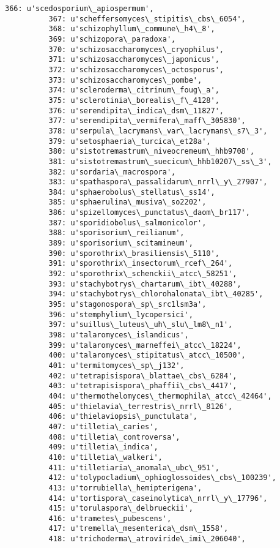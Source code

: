 \documentclass[11pt]{article}
\begin{document}
\begin{Verbatim}[commandchars=\\\{\}]
          366: u'scedosporium\_apiospermum',
          367: u'scheffersomyces\_stipitis\_cbs\_6054',
          368: u'schizophyllum\_commune\_h4\_8',
          369: u'schizopora\_paradoxa',
          370: u'schizosaccharomyces\_cryophilus',
          371: u'schizosaccharomyces\_japonicus',
          372: u'schizosaccharomyces\_octosporus',
          373: u'schizosaccharomyces\_pombe',
          374: u'scleroderma\_citrinum\_foug\_a',
          375: u'sclerotinia\_borealis\_f\_4128',
          376: u'serendipita\_indica\_dsm\_11827',
          377: u'serendipita\_vermifera\_maff\_305830',
          378: u'serpula\_lacrymans\_var\_lacrymans\_s7\_3',
          379: u'setosphaeria\_turcica\_et28a',
          380: u'sistotremastrum\_niveocremeum\_hhb9708',
          381: u'sistotremastrum\_suecicum\_hhb10207\_ss\_3',
          382: u'sordaria\_macrospora',
          383: u'spathaspora\_passalidarum\_nrrl\_y\_27907',
          384: u'sphaerobolus\_stellatus\_ss14',
          385: u'sphaerulina\_musiva\_so2202',
          386: u'spizellomyces\_punctatus\_daom\_br117',
          387: u'sporidiobolus\_salmonicolor',
          388: u'sporisorium\_reilianum',
          389: u'sporisorium\_scitamineum',
          390: u'sporothrix\_brasiliensis\_5110',
          391: u'sporothrix\_insectorum\_rcef\_264',
          392: u'sporothrix\_schenckii\_atcc\_58251',
          393: u'stachybotrys\_chartarum\_ibt\_40288',
          394: u'stachybotrys\_chlorohalonata\_ibt\_40285',
          395: u'stagonospora\_sp\_src1lsm3a',
          396: u'stemphylium\_lycopersici',
          397: u'suillus\_luteus\_uh\_slu\_lm8\_n1',
          398: u'talaromyces\_islandicus',
          399: u'talaromyces\_marneffei\_atcc\_18224',
          400: u'talaromyces\_stipitatus\_atcc\_10500',
          401: u'termitomyces\_sp\_j132',
          402: u'tetrapisispora\_blattae\_cbs\_6284',
          403: u'tetrapisispora\_phaffii\_cbs\_4417',
          404: u'thermothelomyces\_thermophila\_atcc\_42464',
          405: u'thielavia\_terrestris\_nrrl\_8126',
          406: u'thielaviopsis\_punctulata',
          407: u'tilletia\_caries',
          408: u'tilletia\_controversa',
          409: u'tilletia\_indica',
          410: u'tilletia\_walkeri',
          411: u'tilletiaria\_anomala\_ubc\_951',
          412: u'tolypocladium\_ophioglossoides\_cbs\_100239',
          413: u'torrubiella\_hemipterigena',
          414: u'tortispora\_caseinolytica\_nrrl\_y\_17796',
          415: u'torulaspora\_delbrueckii',
          416: u'trametes\_pubescens',
          417: u'tremella\_mesenterica\_dsm\_1558',
          418: u'trichoderma\_atroviride\_imi\_206040',

\end{Verbatim}
\end{document}
